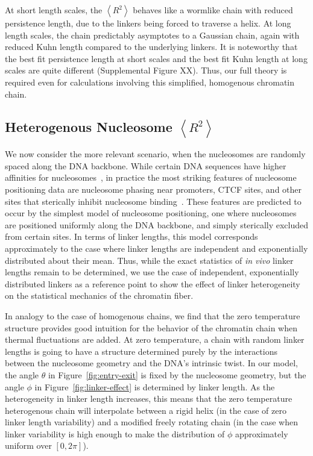 \documentclass[%
 reprint,
superscriptaddress,
showpacs,preprintnumbers,
 amsmath,amssymb,
 aps,
 prl,
]{revtex4-1}
\newcommand{\RR}{\left\langle{}R^2\right\rangle{}}
\begin{document}
At short length scales, the $\RR$ behaves like a wormlike chain with reduced
    persistence length, due to the linkers being forced to traverse a helix.
At long length scales, the chain predictably asymptotes to a Gaussian
    chain, again with reduced Kuhn length compared to the underlying linkers.
It is noteworthy that the best fit persistence length at short scales and the
    best fit Kuhn length at long scales are quite different (Supplemental Figure
    XX).
Thus, our full theory is required even for calculations involving this
    simplified, homogenous chromatin chain.


\subsection{\label{sec:hetero-kuhn}Heterogenous Nucleosome
\texorpdfstring{$\RR$}{<R2>}}

We now consider the more relevant scenario, when the nucleosomes are randomly
    spaced along the DNA backbone.
While certain DNA sequences have higher affinities for
    nucleosomes~\cite{something widom}, in practice the most striking features
    of nucleosome positioning data are nucleosome phasing near promoters, CTCF
    sites, and other sites that sterically inhibit nucleosome
    binding~\cite{widom1992}.
These features are predicted to occur by the simplest model of nucleosome
    positioning, one where nucleosomes are positioned uniformly along the DNA
    backbone, and simply sterically excluded from certain sites.
In terms of linker lengths, this model corresponds approximately to the case
    where linker lengths are independent and exponentially distributed about
    their mean.
Thus, while the exact statistics of \textit{in vivo} linker lengths remain to be
    determined, we use the case of independent, exponentially distributed
    linkers as a reference point to show the effect of linker heterogeneity on
    the statistical mechanics of the chromatin fiber.

In analogy to the case of homogenous chains, we find that the zero temperature
    structure provides good intuition for the behavior of the chromatin chain
    when thermal fluctuations are added.
At zero temperature, a chain with random linker lengths is going to have a
    structure determined purely by the interactions between the nucleosome geometry
    and the DNA's intrinsic twist.
In our model, the angle $\theta$ in Figure~\ref{fig:entry-exit} is fixed by the
    nucleosome geometry, but the angle $\phi$ in Figure~\ref{fig:linker-effect}
    is determined by linker length.
As the heterogeneity in linker length increases, this means that the
    zero temperature heterogenous chain will interpolate between a rigid helix
    (in the case of zero linker length variability) and a modified freely
    rotating chain (in the case when linker variability is high enough to make
    the distribution of $\phi$ approximately uniform over $[0, 2\pi]$).
\end{document}
